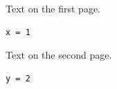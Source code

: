 \documentclass[twoside]{article}
\begin{document}
Text on the first page.
\begin{lstlisting}[caption={A listing caption on an odd page, long enough to take two lines of its text here}]
x = 1
\end{lstlisting}
\clearpage
Text on the second page.
\begin{lstlisting}[caption={A listing caption on an even page, long enough to take two lines of its text here}]
y = 2
\end{lstlisting}
\end{document}
